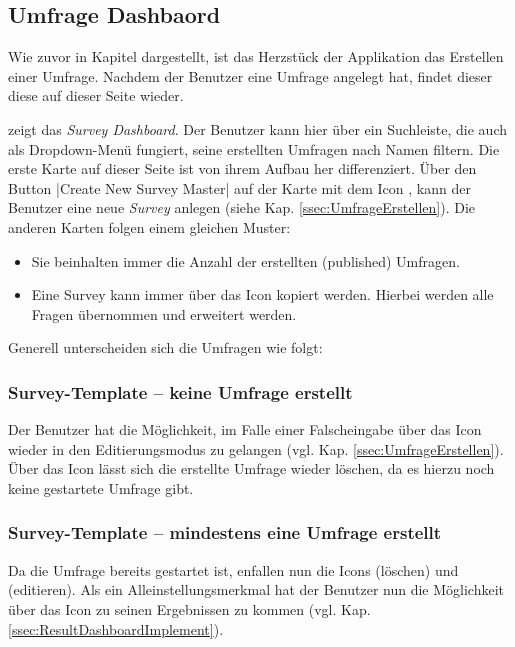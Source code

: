 \subsection{Umfrage Dashbaord}
\label{ssec:UmfrageDashboard}

Wie zuvor in Kapitel  dargestellt, ist das Herzstück der Applikation das Erstellen einer Umfrage. 
Nachdem der Benutzer eine Umfrage  angelegt hat, findet dieser diese auf dieser Seite wieder.

\abb {} zeigt das \emph{Survey Dashboard}.
Der Benutzer kann hier über ein Suchleiste, die auch als Dropdown-Menü fungiert, seine erstellten Umfragen nach Namen filtern. \newline
Die erste Karte auf dieser Seite ist von ihrem Aufbau her differenziert. 
Über den Button \jinline|Create New Survey Master| auf der Karte mit dem Icon \faPlusSquare, kann der Benutzer eine neue \emph{Survey} anlegen (siehe Kap. \vref{ssec:UmfrageErstellen}). \newline
Die anderen Karten folgen einem gleichen Muster: 
% 
\begin{itemize}
	\item Sie beinhalten immer die Anzahl der erstellten (published) Umfragen.
	\item Eine Survey kann immer über das Icon \faCopy\xspace kopiert werden. 
	Hierbei werden alle Fragen übernommen und erweitert werden. 
\end{itemize}
%
Generell unterscheiden sich die Umfragen wie folgt:
% 
\subsubsection*{Survey-Template -- keine Umfrage erstellt}
%
Der Benutzer hat die Möglichkeit, im Falle einer Falscheingabe über das Icon \faEdit\xspace wieder in den Editierungsmodus zu gelangen (vgl. Kap. \vref{ssec:UmfrageErstellen}).
Über das Icon \faTrash\xspace lässt sich die erstellte Umfrage wieder löschen, da es hierzu noch keine gestartete Umfrage gibt. 

\subsubsection*{Survey-Template -- mindestens eine Umfrage erstellt}
%
Da die Umfrage bereits gestartet ist, enfallen nun die Icons \faTrash\xspace (löschen) und \faEdit\xspace (editieren).
Als ein Alleinstellungsmerkmal hat der Benutzer nun die Möglichkeit über das Icon \faIdCard\xspace zu seinen Ergebnissen zu kommen (vgl. Kap. \vref{ssec:ResultDashboardImplement}).

